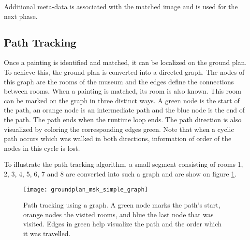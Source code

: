 	Additional meta-data is associated with the matched image and is used for the next phase.

	\subsection{Path Tracking}
	Once a painting is identified and matched, it can be localized on the ground plan. To achieve this, the ground plan is converted into a directed graph. The nodes of this graph are the rooms of the museum and the edges define the connections between rooms. When a painting is matched, its room is also known. This room can be marked on the graph in three distinct ways. A green node is the start of the path, an orange node is an intermediate path and the blue node is the end of the path. The path ends when the runtime loop ends. The path direction is also visualized by coloring the corresponding edges green. Note that when a cyclic path occurs which was walked in both directions, information of order of the nodes in this cycle is lost.


	To illustrate the path tracking algorithm,  a small segment consisting of rooms 1, 2, 3, 4, 5, 6, 7 and 8 are converted into such a graph and are show on figure \ref{fig:groundplan_msk_simple_graph}.



	\begin{figure}
		\texttt{[image: groundplan\_msk\_simple\_graph]}
		\caption{Path tracking using a graph. A green node marks the path's start, orange nodes the visited rooms, and blue the last node that was visited. Edges in green help visualize the path and the order which it was travelled.}
		\label{fig:groundplan_msk_simple_graph}
	\end{figure}

